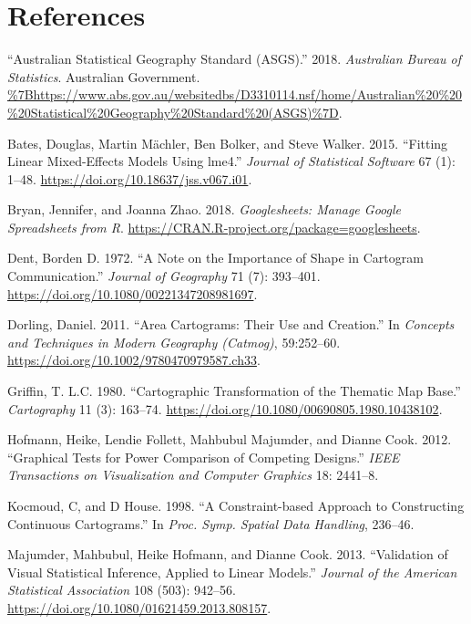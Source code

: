 \documentclass[conference,final,]{IEEEtran}
\begin{document}
\newpage

\hypertarget{references}{%
\section{References}\label{references}}

\hypertarget{refs}{}
\leavevmode\hypertarget{ref-abs2016}{}%
``Australian Statistical Geography Standard (ASGS).'' 2018. \emph{Australian Bureau of Statistics}. Australian Government. \url{\%7Bhttps://www.abs.gov.au/websitedbs/D3310114.nsf/home/Australian\%20\%20\%20Statistical\%20Geography\%20Standard\%20(ASGS)\%7D}.

\leavevmode\hypertarget{ref-lme4}{}%
Bates, Douglas, Martin Mächler, Ben Bolker, and Steve Walker. 2015. ``Fitting Linear Mixed-Effects Models Using lme4.'' \emph{Journal of Statistical Software} 67 (1): 1--48. \url{https://doi.org/10.18637/jss.v067.i01}.

\leavevmode\hypertarget{ref-sheets}{}%
Bryan, Jennifer, and Joanna Zhao. 2018. \emph{Googlesheets: Manage Google Spreadsheets from R}. \url{https://CRAN.R-project.org/package=googlesheets}.

\leavevmode\hypertarget{ref-NISCC}{}%
Dent, Borden D. 1972. ``A Note on the Importance of Shape in Cartogram Communication.'' \emph{Journal of Geography} 71 (7): 393--401. \url{https://doi.org/10.1080/00221347208981697}.

\leavevmode\hypertarget{ref-ACTUC}{}%
Dorling, Daniel. 2011. ``Area Cartograms: Their Use and Creation.'' In \emph{Concepts and Techniques in Modern Geography (Catmog)}, 59:252--60. \url{https://doi.org/10.1002/9780470979587.ch33}.

\leavevmode\hypertarget{ref-CTTMB}{}%
Griffin, T. L.C. 1980. ``Cartographic Transformation of the Thematic Map Base.'' \emph{Cartography} 11 (3): 163--74. \url{https://doi.org/10.1080/00690805.1980.10438102}.

\leavevmode\hypertarget{ref-GTPCCD}{}%
Hofmann, Heike, Lendie Follett, Mahbubul Majumder, and Dianne Cook. 2012. ``Graphical Tests for Power Comparison of Competing Designs.'' \emph{IEEE Transactions on Visualization and Computer Graphics} 18: 2441--8.

\leavevmode\hypertarget{ref-CBATCC}{}%
Kocmoud, C, and D House. 1998. ``A Constraint-based Approach to Constructing Continuous Cartograms.'' In \emph{Proc. Symp. Spatial Data Handling}, 236--46.

\leavevmode\hypertarget{ref-VVSIALM}{}%
Majumder, Mahbubul, Heike Hofmann, and Dianne Cook. 2013. ``Validation of Visual Statistical Inference, Applied to Linear Models.'' \emph{Journal of the American Statistical Association} 108 (503): 942--56. \url{https://doi.org/10.1080/01621459.2013.808157}.
\end{document}
